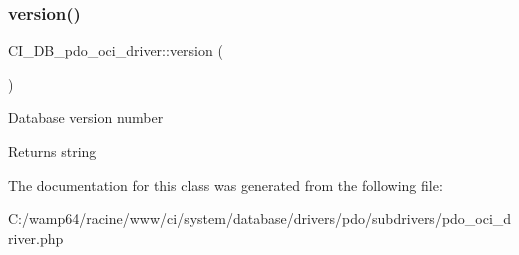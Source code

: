 \subsubsection{\texorpdfstring{version()}{version()}}
{\footnotesize\ttfamily C\+I\+\_\+\+D\+B\+\_\+pdo\+\_\+oci\+\_\+driver\+::version (\begin{DoxyParamCaption}{ }\end{DoxyParamCaption})}

Database version number

\begin{DoxyReturn}{Returns}
string 
\end{DoxyReturn}


The documentation for this class was generated from the following file\+:\begin{DoxyCompactItemize}
\item 
C\+:/wamp64/racine/www/ci/system/database/drivers/pdo/subdrivers/pdo\+\_\+oci\+\_\+driver.\+php\end{DoxyCompactItemize}
